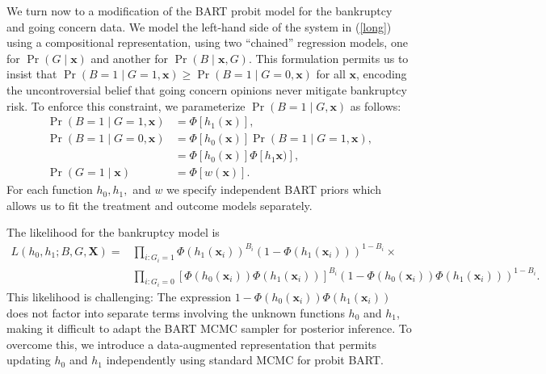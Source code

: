 \documentclass[aoas,preprint, 11pt, dvipsnames, table, x11name]{imsart}
\theoremstyle{remark}
\begin{document}
	We turn now to a modification of the BART probit model for the bankruptcy and going concern data. We model the left-hand side of the system in (\ref{long}) using a compositional representation, using two ``chained'' regression models, one for $\Pr(G \mid \mathbf{x})$ and another for $\Pr(B \mid \mathbf{x}, G)$. This formulation permits us to insist that $\Pr(B=1\mid G=1, \mathbf{x}) \geq \Pr(B=1\mid G=0, \mathbf{x})$ for all $\mathbf{x}$, encoding the uncontroversial belief that going concern opinions never mitigate bankruptcy risk. To enforce this constraint, we parameterize $\Pr(B=1\mid G, \mathbf{x})$ as follows:
	\begin{equation}
		\begin{split}
			\Pr(B=1\mid G=1, \mathbf{x}) &= \Phi[h_1(\mathbf{x})],\\
			\Pr(B=1\mid G=0, \mathbf{x}) &= \Phi[h_0(\mathbf{x})]\Pr(B=1\mid G=1, \mathbf{x}),
			\\ &= \Phi[h_0(\mathbf{x})]\Phi[h_1\mathbf{x})],\\
			\Pr(G=1\mid \mathbf{x}) &= \Phi[w(\mathbf{x})].
		\end{split}
	\end{equation}
	For each function $h_0, h_1,$ and $w$ we specify independent BART priors which allows us to fit the treatment and outcome models separately. 
	
	The likelihood for the bankruptcy model is
	\begin{equation}
		\begin{split}
			L(h_0, h_1; B, G, \mathbf{X}) =&\prod_{i: G_i=1}\Phi(h_1(\mathbf{x}_i))^{B_i}(1-\Phi(h_1(\mathbf{x}_i)))^{1-B_i} \times \\
			&\prod_{i: G_i=0}[\Phi(h_0(\mathbf{x}_i))\Phi(h_1(\mathbf{x}_i))]^{B_i} (1-\Phi(h_0(\mathbf{x}_i))\Phi(h_1(\mathbf{x}_i)))^{1-B_i}\label{eq:bart-da0}.
		\end{split}
	\end{equation}
	This likelihood is challenging: The expression $1- \Phi(h_0(\mathbf{x}_i))\Phi(h_1(\mathbf{x}_i))$ does not factor into separate terms involving the unknown functions $h_0$ and $h_1$, making it difficult to adapt the BART MCMC sampler for posterior inference. To overcome this, we introduce a data-augmented representation that permits updating $h_0$ and $h_1$ independently using standard MCMC for probit BART. 
	
\end{document}
